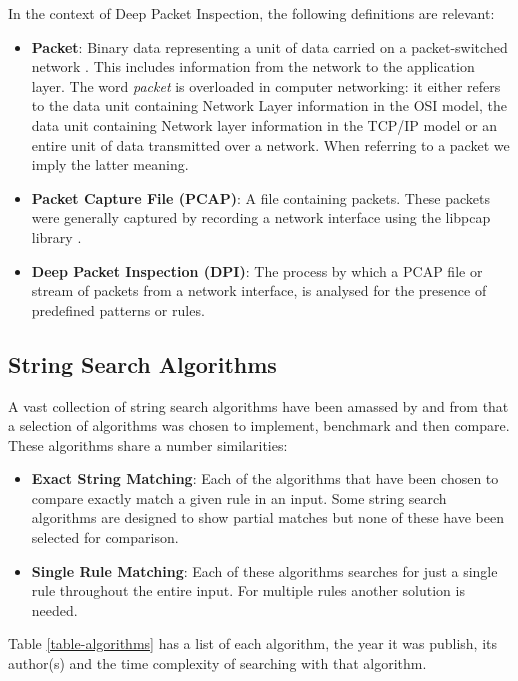 \documentclass[11pt]{article}
\begin{document}
In the context of Deep Packet Inspection, the following definitions are relevant:
\begin{itemize}
  \item \textbf{Packet}: Binary data representing a unit of data carried on a packet-switched network . This includes information from the network to the application layer. The word \textit{packet} is overloaded in computer networking: it either refers to the data unit containing Network Layer information in the OSI model, the data unit containing Network layer information in the TCP/IP model or an entire unit of data transmitted over a network. When referring to a packet we imply the latter meaning.
  \item \textbf{Packet Capture File (PCAP)}: A file containing packets. These packets were generally captured by recording a network interface using the libpcap library \citep{tcpdump2016}.
  \item \textbf{Deep Packet Inspection (DPI)}: The process by which a PCAP file or stream of packets from a network interface, is analysed for the presence of predefined patterns or rules.
\end{itemize}

\subsection{String Search Algorithms}

A vast collection of string search algorithms have been amassed by \citet{charras2004} and from that a selection of algorithms was chosen to implement, benchmark and then compare. These algorithms share a number similarities:
\begin{itemize}
  \item \textbf{Exact String Matching}: Each of the algorithms that have been chosen to compare exactly match a given rule in an input. Some string search algorithms are designed to show partial matches but none of these have been selected for comparison.
  \item \textbf{Single Rule Matching}: Each of these algorithms searches for just a single rule throughout the entire input. For multiple rules another solution is needed.
\end{itemize}

Table \ref{table-algorithms} has a list of each algorithm, the year it was publish, its author(s) and the time complexity of searching with that algorithm.
\end{document}
